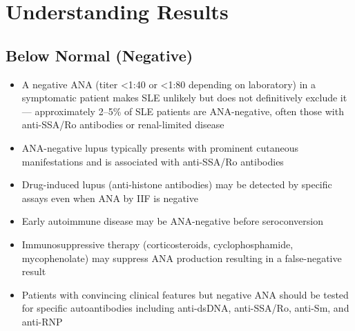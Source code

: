 \section*{Understanding Results}

\subsection*{Below Normal (Negative)}
\begin{itemize}
  \item A negative ANA (titer <1:40 or <1:80 depending on laboratory) in a symptomatic patient makes SLE unlikely but does not definitively exclude it --- approximately 2--5\% of SLE patients are ANA-negative, often those with anti-SSA/Ro antibodies or renal-limited disease
  \item ANA-negative lupus typically presents with prominent cutaneous manifestations and is associated with anti-SSA/Ro antibodies
  \item Drug-induced lupus (anti-histone antibodies) may be detected by specific assays even when ANA by IIF is negative
  \item Early autoimmune disease may be ANA-negative before seroconversion
  \item Immunosuppressive therapy (corticosteroids, cyclophosphamide, mycophenolate) may suppress ANA production resulting in a false-negative result
  \item Patients with convincing clinical features but negative ANA should be tested for specific autoantibodies including anti-dsDNA, anti-SSA/Ro, anti-Sm, and anti-RNP
\end{itemize}

